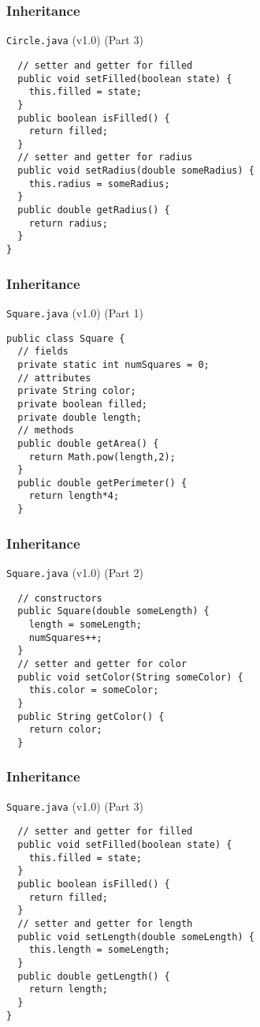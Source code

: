 \documentclass[10pt, compress]{beamer}
\begin{document}
\begin{frame}[fragile]
  \frametitle{Inheritance}
  \begin{block}{\texttt{Circle.java} (v1.0) (Part 3)}
    \begin{verbatim}
  // setter and getter for filled
  public void setFilled(boolean state) {
    this.filled = state;
  }
  public boolean isFilled() {
    return filled;
  }
  // setter and getter for radius
  public void setRadius(double someRadius) {
    this.radius = someRadius;
  }
  public double getRadius() {
    return radius;
  }
}
    \end{verbatim}
  \end{block}
\end{frame}

\begin{frame}[fragile]
  \frametitle{Inheritance}
  \begin{block}{\texttt{Square.java} (v1.0) (Part 1)}
    \begin{verbatim}
public class Square {
  // fields
  private static int numSquares = 0;
  // attributes
  private String color;
  private boolean filled;
  private double length;
  // methods
  public double getArea() {
    return Math.pow(length,2);
  }
  public double getPerimeter() {
    return length*4;
  }
    \end{verbatim}
  \end{block}
\end{frame}

\begin{frame}[fragile]
  \frametitle{Inheritance}
  \begin{block}{\texttt{Square.java} (v1.0) (Part 2)}
    \begin{verbatim}
  // constructors
  public Square(double someLength) {
    length = someLength;
    numSquares++;
  }
  // setter and getter for color
  public void setColor(String someColor) {
    this.color = someColor;
  }
  public String getColor() {
    return color;
  }
    \end{verbatim}
  \end{block}
\end{frame}

\begin{frame}[fragile]
  \frametitle{Inheritance}
  \begin{block}{\texttt{Square.java} (v1.0) (Part 3)}
    \begin{verbatim}
  // setter and getter for filled
  public void setFilled(boolean state) {
    this.filled = state;
  }
  public boolean isFilled() {
    return filled;
  }
  // setter and getter for length
  public void setLength(double someLength) {
    this.length = someLength;
  }
  public double getLength() {
    return length;
  }
}
    \end{verbatim}
  \end{block}
\end{frame}
\end{document}
